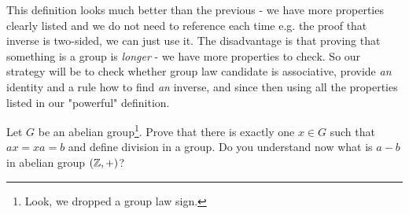 This definition looks much better than the previous - we have more properties clearly listed and we do not need to reference each time e.g. the proof that inverse is two-sided, we can just use it. The disadvantage
is that proving that something is a group is \emph{longer} - we have more properties to check. So our strategy will be to check whether group law candidate is associative, provide \emph{an} identity and a rule how to find \emph{an} inverse, and since then using all the properties listed in our "powerful" definition.


\begin{exercise}
  Let $G$ be an abelian group\footnote{Look, we dropped a group law sign.}. Prove that there is exactly one $x\in G$ such that $ax=xa=b$ and define division in a group. Do you understand now what is $a-b$ in abelian group $(\mathbb Z, +)$?
\end{exercise}
